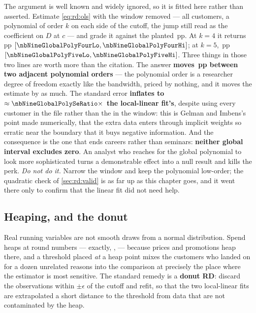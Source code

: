 The argument is well known and widely ignored, so it is fitted here rather than asserted. Estimate
\cref{eq:rd:ols} with the window removed --- all \nbNineN{} customers, a polynomial of order $k$ on
each side of the cutoff, the jump still read as the coefficient on $D$ at $c$ --- and grade it
against the planted \nbNineTrueJump{}\,pp. At $k = 4$ it returns \nbNineGlobalPolyFour{}\,pp
$[\nbNineGlobalPolyFourLo, \nbNineGlobalPolyFourHi]$; at $k = 5$, \nbNineGlobalPolyFive{}\,pp
$[\nbNineGlobalPolyFiveLo, \nbNineGlobalPolyFiveHi]$. Three things in those two lines are worth more
than the citation. The answer \textbf{moves \nbNineGlobalPolyShift{}\,pp between two adjacent
polynomial orders} --- the polynomial order is a researcher degree of freedom exactly like the
bandwidth, priced by nothing, and it moves the estimate by as much. The standard error
\textbf{inflates to $\approx \nbNineGlobalPolySeRatio\times$ the
local-linear fit's}, despite using every customer in the file rather than the \nbNineRdN{} in the
window: this is Gelman and Imbens's point made numerically, that the extra data enters through
implicit weights so erratic near the boundary that it buys negative information. And the
consequence is the one that ends careers rather than seminars: \textbf{neither global interval
excludes zero}. An analyst who reaches for the global polynomial to look more sophisticated turns a
demonstrable effect into a null result and kills the perk. \emph{Do not do it.} Narrow the window and
keep the polynomial low-order; the quadratic check of \cref{sec:rd:valid} is as far up as this
chapter goes, and it went there only to confirm that the linear fit did not need help.

\subsection*{Heaping, and the donut}

Real running variables are not smooth draws from a normal distribution. Spend heaps at round numbers
---  exactly, ,  --- because prices and promotions heap there, and a
threshold placed \emph{at} a heap point mixes the customers who landed on  for a dozen
unrelated reasons into the comparison at precisely the place where the estimator is most sensitive.
The standard remedy is a \textbf{donut RD}: discard the observations within $\pm\epsilon$ of the
cutoff and refit, so that the two local-linear fits are extrapolated a short distance to the
threshold from data that are not contaminated by the heap.

